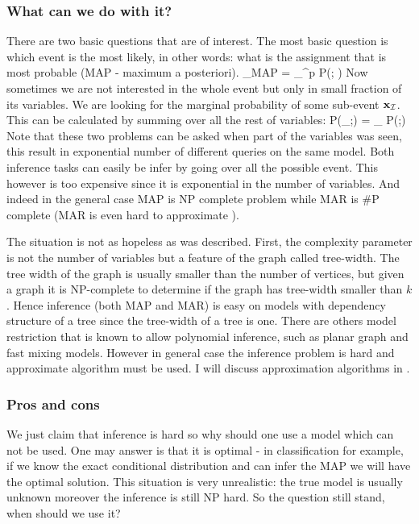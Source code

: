 \subsubsection{What can we do with it?}
There are two basic questions that are of interest.
The most basic question is which event is the most likely, in other words: what is the assignment that is most probable (MAP - maximum a posteriori).
\be
\label{eq:MAP}
\xx_{MAP} = \arg \max_{\xx \in \cX^p} P(\xx; \thetav) 
\ee
Now sometimes we are not interested in the whole event but only in small fraction of its variables.
We are looking for the marginal probability of some sub-event ${\bf x}_{{\cal I}}$.
This can be calculated by summing over all the rest of variables:
\be
\label{eq:MAR}
P(\xx_{\cI};\thetav) = \sum_{} P(\zz;\thetav)
\ee
Note that these two problems can be asked when part of the variables was seen, this result in exponential number of different queries on the same model. 
Both inference tasks can easily be infer by going over all the possible event.
This however is too expensive since it is exponential in the number of variables.
And indeed in the general case MAP\cite{shimony1994finding} is NP complete problem while MAR\cite{cooper1990computational} is \#P complete (MAR is even hard to approximate \cite{roth1996hardness}).

The situation is not as hopeless as was described.
First, the complexity parameter is not the number of variables but a feature of the graph called tree-width\cite{robertson1983graph,robertson1994quickly}.
The tree width of the graph is usually smaller than the number of vertices, but given a graph it is NP-complete to determine if the graph has tree-width smaller than $k$\cite{Arnborg:1987}.
Hence inference (both MAP and MAR) is easy on models with dependency structure of a tree since the tree-width of a tree is one.
There are others model restriction that is known to allow polynomial inference, such as planar graph \cite{jaakkola2007approximate} and fast mixing models\cite{jerrum1993polynomial}.
However in general case the inference problem is hard and approximate algorithm must be used.
I will discuss approximation algorithms in  . 
\subsubsection{Pros and cons}
We just claim that inference is hard so why should one use a model which can not be used.
One may answer is that it is optimal - in classification for example, if we know the exact conditional distribution and can infer the MAP we will have the optimal solution. 
This situation is very unrealistic: the true model is usually unknown moreover the inference is still NP hard.
So the question still stand, when should we use it?

